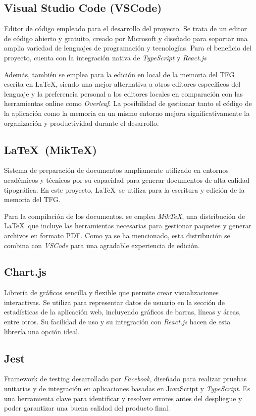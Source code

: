 \subsection{Visual Studio Code (VSCode)}
Editor de código empleado para el desarrollo del proyecto. Se trata de un editor de código abierto y gratuito, creado por Microsoft y diseñado para soportar una amplia variedad de lenguajes de programación y tecnologías. Para el beneficio del proyecto, cuenta con la integración nativa de \textit{TypeScript} y \textit{React.js}

Además, también se emplea para la edición en local de la memoria del TFG escrita en \LaTeX, siendo una mejor alternativa a otros editores específicos del lenguaje y la preferencia personal a los editores locales en comparación con las herramientas online como \textit{Overleaf}. La posibilidad de gestionar tanto el código de la aplicación como la memoria en un mismo entorno mejora significativamente la organización y productividad durante el desarrollo.

\subsection{\LaTeX\ (MikTeX)}
Sistema de preparación de documentos ampliamente utilizado en entornos académicos y técnicos por su capacidad para generar documentos de alta calidad tipográfica. En este proyecto, \LaTeX\ se utiliza para la escritura y edición de la memoria del TFG.

Para la compilación de los documentos, se emplea \textit{MikTeX}, una distribución de \LaTeX\ que incluye las herramientas necesarias para gestionar paquetes y generar archivos en formato PDF. Como ya se ha mencionado, esta distribución se combina con \textit{VSCode} para una agradable experiencia de edición.

\subsection{Chart.js}
Librería de gráficos sencilla y flexible que permite crear visualizaciones interactivas. Se utiliza para representar datos de usuario en la sección de estadísticas de la aplicación web, incluyendo gráficos de barras, líneas y áreas, entre otros. Su facilidad de uso y su integración con \textit{React.js} hacen de esta librería una opción ideal.

\subsection{Jest}
Framework de testing desarrollado por \textit{Facebook}, diseñado para realizar pruebas unitarias y de integración en aplicaciones basadas en JavaScript y \textit{TypeScript}. Es una herramienta clave para identificar y resolver errores antes del despliegue y poder garantizar una buena calidad del producto final.

